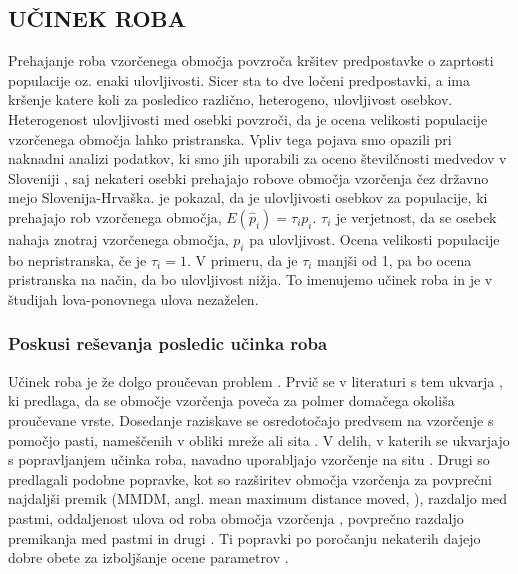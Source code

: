 \subsection{UČINEK ROBA}
Prehajanje roba vzorčenega območja povzroča kršitev predpostavke o zaprtosti populacije oz. enaki ulovljivosti. Sicer sta to dve ločeni predpostavki, a ima kršenje katere koli za posledico različno, heterogeno, ulovljivost osebkov. Heterogenost ulovljivosti med osebki povzroči, da je ocena velikosti populacije vzorčenega območja lahko pristranska. Vpliv tega pojava smo opazili pri naknadni analizi podatkov, ki smo jih uporabili za oceno številčnosti medvedov v Sloveniji \citep{skrbinsek_lustrik_2019}, saj nekateri osebki prehajajo robove območja vzorčenja čez državno mejo Slovenija-Hrvaška. \citet{kendall_robustness_1999} je pokazal, da je ulovljivosti osebkov za populacije, ki prehajajo rob vzorčenega območja, $E(\hat{p}_i) = \tau_{i} p_{i}$. $\tau_i$ je verjetnost, da se osebek nahaja znotraj vzorčenega območja, $p_{i}$ pa ulovljivost. Ocena velikosti populacije bo nepristranska, če je $\tau_{i} = 1$. V primeru, da je $\tau_{i}$ manjši od 1, pa bo ocena pristranska na način, da bo ulovljivost nižja. To imenujemo učinek roba \citep{hansson_home_1969, white_capture-recapture_1982, wilson_evaluation_1985} in je v študijah lova-ponovnega ulova nezaželen.

\subsubsection[\bfseries{Poskusi reševanja posledic učinka roba}]{Poskusi reševanja posledic učinka roba}
Učinek roba je že dolgo proučevan problem \citep{efford_density_2004}. Prvič se v literaturi s tem ukvarja \citet{dice_census_1938, dice_methods_1941}, ki predlaga, da se območje vzorčenja poveča za polmer domačega okoliša proučevane vrste. Dosedanje raziskave se osredotočajo predvsem na vzorčenje s pomočjo pasti, nameščenih v obliki mreže ali sita \citep{williams_analysis_2002}. V delih, v katerih se ukvarjajo s popravljanjem učinka roba, navadno uporabljajo vzorčenje na situ \citep{parmenter_small-mammal_2003}. Drugi so predlagali podobne popravke, kot so razširitev območja vzorčenja za povprečni najdaljši premik (MMDM, angl. mean maximum distance moved, \citet{wilson_evaluation_1985}), razdaljo med pastmi, oddaljenost ulova od roba območja vzorčenja \citep{boulanger_sources_2004}, povprečno razdaljo premikanja med pastmi in drugi \citep{miller_brown_1997, boulanger_corrigendum_2001, royle_spatial_2013}. Ti popravki po poročanju nekaterih dajejo dobre obete za izboljšanje ocene parametrov \citep{whittington_comparison_2015}.

